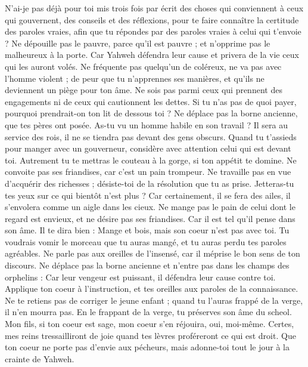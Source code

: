 \begin{multicols}{2}
N’ai-je pas déjà pour toi mis trois fois par écrit des choses qui conviennent à ceux qui gouvernent, des conseils et des réflexions,
pour te faire connaître la certitude des paroles vraies, afin que tu répondes par des paroles vraies à celui qui t’envoie ?
Ne dépouille pas le pauvre, parce qu'il est pauvre ; et n’opprime pas le malheureux à la porte.
Car Yahweh défendra leur cause et privera de la vie ceux qui les auront volés.
Ne fréquente pas quelqu’un de coléreux, ne va pas avec l'homme violent ;
de peur que tu n’apprennes ses manières, et qu’ils ne deviennent un piège pour ton âme.
Ne sois pas parmi ceux qui prennent des engagements ni de ceux qui cautionnent les dettes.
Si tu n'as pas de quoi payer, pourquoi prendrait-on ton lit de dessous toi ?
Ne déplace pas la borne ancienne, que tes pères ont posée.
As-tu vu un homme habile en son travail ? Il sera au service des rois, il ne se tiendra pas devant des gens obscurs.
\VerseOne{}Quand tu t’assieds pour manger avec un gouverneur, considère avec attention celui qui est devant toi.
Autrement tu te mettras le couteau à la gorge, si ton appétit te domine.
Ne convoite pas ses friandises, car c'est un pain trompeur.
Ne travaille pas en vue d’acquérir des richesses ; désiste-toi de la résolution que tu as prise.
Jetteras-tu tes yeux sur ce qui bientôt n'est plus ? Car certainement, il se fera des ailes, il s'envolera comme un aigle dans les cieux.
Ne mange pas le pain de celui dont le regard est envieux, et ne désire pas ses friandises.
Car il est tel qu'il pense dans son âme. Il te dira bien : Mange et bois, mais son coeur n'est pas avec toi.
Tu voudrais vomir le morceau que tu auras mangé, et tu auras perdu tes paroles agréables.
Ne parle pas aux oreilles de l’insensé, car il méprise le bon sens de ton discours.
Ne déplace pas la borne ancienne et n'entre pas dans les champs des orphelins :
Car leur vengeur est puissant, il défendra leur cause contre toi.
Applique ton coeur à l'instruction, et tes oreilles aux paroles de la connaissance.
Ne te retiens pas de corriger le jeune enfant ; quand tu l'auras frappé de la verge, il n'en mourra pas.
En le frappant de la verge, tu préserves son âme du scheol.
Mon fils, si ton coeur est sage, mon coeur s'en réjouira, oui, moi-même.
Certes, mes reins tressailliront de joie quand tes lèvres proféreront ce qui est droit.
Que ton coeur ne porte pas d'envie aux pécheurs, mais adonne-toi tout le jour à la crainte de Yahweh.

\end{multicols}
